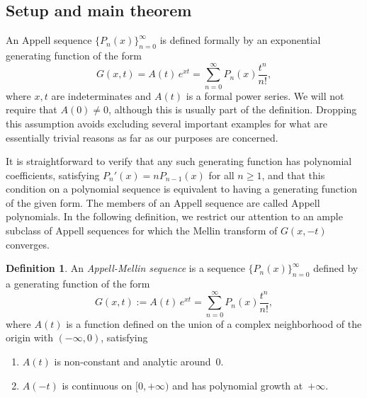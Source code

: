 \documentclass[11pt,a4paper]{amsart}
\theoremstyle{plain}
\theoremstyle{plain}
\theoremstyle{definition}
\newtheorem{definition}{Definition}
\theoremstyle{remark}
\begin{document}
\subsection{Setup and main theorem}
\label{subsec:setup_and_main_theorem}



An Appell sequence $\{P_{n}(x)\}_{n=0}^{\infty}$ is defined formally by an exponential generating function of the form
\[
	G(x,t) = A(t) \, e^{xt} = \sum_{n=0}^\infty P_{n}(x)\frac{t^n}{n!},
\]
where $x,t$ are indeterminates and $A(t)$ is a formal power series. We will not require that $A(0) \neq 0$, although this is usually part of the definition. Dropping this assumption avoids excluding several important examples for what are essentially trivial reasons as far as our purposes are concerned.

It is straightforward to verify that any such generating function has polynomial coefficients, satisfying $P_{n}'(x) = n P_{n-1}(x)$ for all $n \geq 1$, and that this condition on a polynomial sequence is equivalent to having a generating function of the given form. The members of an Appell sequence are called Appell polynomials. In the following definition, we restrict our attention to an ample subclass of Appell sequences for which the Mellin transform of $G(x,-t)$ converges.


\begin{definition}
\label{D:Appell-Mellin} 
An \emph{Appell-Mellin sequence} is a sequence $\{P_{n}(x)\}_{n=0}^{\infty}$ defined by a generating function of the form
\begin{equation}
\label{E:Appell_GF}
    G(x,t) := A(t) \, e^{xt} = \sum_{n=0}^\infty P_{n}(x)\frac{t^n}{n!},
\end{equation}
where $A(t)$ is a function defined on the union of a complex neighborhood of the origin with $(-\infty,0)$, satisfying
\begin{enumerate}[label=\normalfont(\alph*)]
  \item $A(t)$ is non-constant and analytic around~$0$.
  \item $A(-t)$ is continuous on $[0,+\infty)$ and has polynomial growth at~$+\infty$.
\end{enumerate}
\end{definition}
\end{document}
